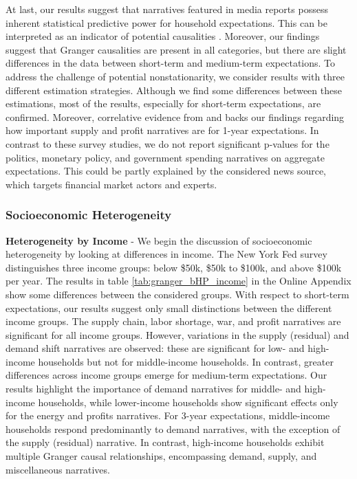 At last,  our results suggest that narratives featured in media reports possess inherent statistical predictive power for household expectations. This can be interpreted as an indicator of potential causalities \cite{shojaie.2022}. Moreover, our findings suggest that Granger causalities are present in all categories, but there are slight differences in the data between short-term and medium-term expectations.  To address the challenge of potential nonstationarity, we consider results with three different estimation strategies. Although we find some differences between these estimations, most of the results, especially for short-term expectations, are confirmed. Moreover, correlative evidence from \cite{Andre.2023} and \cite{Stantcheva.2024} backs our findings regarding how important supply and profit narratives are for 1-year expectations. In contrast to these survey studies, we do not report significant p-values for the politics, monetary policy, and government spending narratives on aggregate expectations. This could be partly explained by the considered news source, which targets financial market actors and experts. 



\subsubsection{Socioeconomic Heterogeneity}

\textbf{Heterogeneity by Income} - We begin the discussion of socioeconomic heterogeneity by looking at differences in income. The New York Fed survey distinguishes three income groups: below \$50k, \$50k to \$100k, and above \$100k per year. The results in table \ref{tab:granger_bHP_income} in the Online Appendix show some differences between the considered groups. With respect to short-term expectations, our results suggest only small distinctions between the different income groups. The supply chain, labor shortage, war, and profit narratives are significant for all income groups. However, variations in the supply (residual) and demand shift narratives are observed: these are significant for low- and high-income households but not for middle-income households. In contrast, greater differences across income groups emerge for medium-term expectations. Our results highlight the importance of demand narratives for middle- and high-income households, while lower-income households show significant effects only for the energy and profits narratives. For 3-year expectations, middle-income households respond predominantly to demand narratives, with the exception of the supply (residual) narrative. In contrast, high-income households exhibit multiple Granger causal relationships, encompassing demand, supply, and miscellaneous narratives.\\


